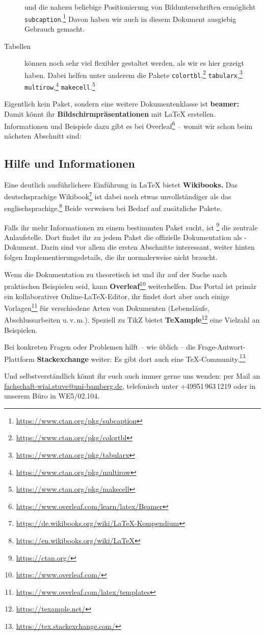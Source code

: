 \begin{description}
		und die nahezu beliebige Positionierung von Bildunterschriften ermöglicht \texttt{subcaption}.\footnote{\url{https://www.ctan.org/pkg/subcaption}}
		Davon haben wir auch in diesem Dokument ausgiebig Gebrauch gemacht.
	\item[Tabellen]
		können noch sehr viel flexibler gestaltet werden, als wir es hier gezeigt haben.
		Dabei helfen unter anderem die Pakete
		\texttt{colortbl},\footnote{\url{https://www.ctan.org/pkg/colortbl}}
		\texttt{tabularx},\footnote{\url{https://www.ctan.org/pkg/tabularx}}
		\texttt{multirow},\footnote{\url{https://www.ctan.org/pkg/multirow}}
		\texttt{makecell}.\footnote{\url{https://www.ctan.org/pkg/makecell}}
\end{description}

\noindent Eigentlich kein Paket, sondern eine weitere Dokumentenklasse ist \textbf{beamer:} Damit könnt ihr \textbf{Bildschirmpräsentationen} mit \LaTeX{} erstellen.
Informationen und Beispiele dazu gibt es bei Overleaf\footnote{\url{https://www.overleaf.com/learn/latex/Beamer}} –
womit wir schon beim nächsten Abschnitt sind:

\subsection{Hilfe und Informationen}

Eine deutlich ausführlichere Einführung in \LaTeX{} bietet \textbf{Wikibooks.}
Das deutschsprachige Wikibook\footnote{\url{https://de.wikibooks.org/wiki/LaTeX-Kompendium}} ist dabei noch etwas unvollständiger als das englischsprachige.\footnote{\url{https://en.wikibooks.org/wiki/LaTeX}}
Beide verweisen bei Bedarf auf zusätzliche Pakete.

Falls ihr mehr Informationen zu einem bestimmten Paket sucht, ist \footnote{\url{https://ctan.org/}} die zentrale Anlaufstelle.
Dort findet ihr zu jedem Paket die offizielle Dokumentation als -Dokument.
Darin sind vor allem die ersten Abschnitte interessant, weiter hinten folgen Implementierungsdetails, die ihr normalerweise nicht braucht.

Wenn die Dokumentation zu theoretisch ist und ihr auf der Suche nach praktischen Beispielen seid, kann \textbf{Overleaf}\footnote{\url{https://www.overleaf.com/}} weiterhelfen.
Das Portal ist primär ein kollaborativer Online-\LaTeX-Editor, ihr findet dort aber auch einige Vorlagen\footnote{\url{https://www.overleaf.com/latex/templates}} für verschiedene Arten von Dokumenten (Lebensläufe, Abschlussarbeiten u.\,v.\,m.).
Speziell zu TikZ bietet \textbf{\TeX{}ample}\footnote{\url{https://texample.net/}} eine Vielzahl an Beispielen.

Bei konkreten Fragen oder Problemen hilft – wie üblich – die Frage-Antwort-Plattform \textbf{Stackexchange} weiter:
Es gibt dort auch eine \TeX-Community.\footnote{\url{https://tex.stackexchange.com/}}

Und selbstverständlich könnt ihr euch auch immer gerne uns wenden:
per Mail an \href{mailto:fachschaft-wiai.stuve@uni-bamberg.de}{fachschaft-wiai.stuve@uni-bamberg.de}, telefonisch unter +49951\,963\,1219 oder in unserem Büro in WE5/02.104.
